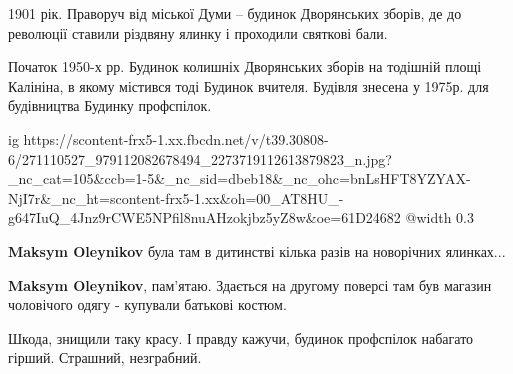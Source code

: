  
 
 
 
 


1901 рік. Праворуч від міської Думи – будинок Дворянських зборів, де до
революції ставили різдвяну ялинку і проходили святкові бали.


Початок 1950-х рр. Будинок колишніх Дворянських зборів на тодішній площі
Калініна, в якому містився тоді Будинок вчителя. Будівля знесена у 1975р. для
будівництва Будинку профспілок.

\ifcmt
  ig https://scontent-frx5-1.xx.fbcdn.net/v/t39.30808-6/271110527_979112082678494_2273719112613879823_n.jpg?_nc_cat=105&ccb=1-5&_nc_sid=dbeb18&_nc_ohc=bnLsHFT8YZYAX-NjI7r&_nc_ht=scontent-frx5-1.xx&oh=00_AT8HU_-g647IuQ_4Jnz9rCWE5NPfil8nuAHzokjbz5yZ8w&oe=61D24682
  @width 0.3
\fi

\textbf{Maksym Oleynikov} була там в дитинстві кілька разів на новорічних ялинках...

\textbf{Maksym Oleynikov}, пам'ятаю. Здається на другому поверсі там був магазин чоловічого одягу - купували батькові костюм.


Шкода, знищили таку красу. І правду кажучи, будинок профспілок набагато гірший.
Страшний, незграбний.
